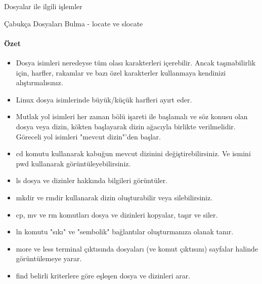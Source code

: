\begin{section}{Dosyalar ile ilgili işlemler}
\begin{subsection}{Çabukça Dosyaları Bulma - locate ve slocate}
\paragraph{Özet}{
\begin{itemize}
 \item Dosya isimleri neredeyse tüm olası karakterleri içerebilir. Ancak taşınabilirlik için,  harfler, rakamlar ve bazı özel karakterler kullanmaya kendinizi alıştırmalısınız.
 \item Linux dosya isimlerinde büyük/küçük harfleri ayırt eder.
 \item Mutlak yol isimleri her zaman bölü işareti ile başlamalı ve söz konusu olan dosya veya dizin, kökten başlayarak dizin ağacıyla birlikte verilmelidir. Göreceli yol isimleri "mevcut dizin"'den başlar.
 \item cd komutu kullanarak kabuğun mevcut dizinini değiştirebilirsiniz. Ve ismini pwd kullanarak görüntüleyebilirsiniz.
 \item ls dosya ve dizinler hakkında bilgileri görüntüler.
 \item mkdir ve rmdir kullanarak dizin oluşturabilir veya silebilirsiniz.
 \item cp, mv ve rm komutları dosya ve dizinleri kopyalar, taşır ve siler.
 \item ln komutu "sıkı" ve "sembolik" bağlantılar oluşturmanıza olanak tanır.
 \item more ve less terminal çıktısında dosyaları (ve komut çıktısını) sayfalar halinde görüntülemeye yarar.
 \item find belirli kriterlere göre eşleşen dosya ve dizinleri arar.
\end{itemize}}
\end{subsection}
\end{section}